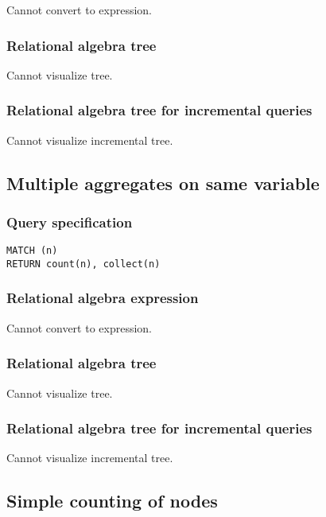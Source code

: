 Cannot convert to expression.

\subsubsection*{Relational algebra tree}

Cannot visualize tree.

\subsubsection*{Relational algebra tree for incremental queries}

Cannot visualize incremental tree.

\subsection{Multiple aggregates on same variable}

\subsubsection*{Query specification}

\begin{lstlisting}
MATCH (n)
RETURN count(n), collect(n)
\end{lstlisting}

\subsubsection*{Relational algebra expression}

Cannot convert to expression.

\subsubsection*{Relational algebra tree}

Cannot visualize tree.

\subsubsection*{Relational algebra tree for incremental queries}

Cannot visualize incremental tree.

\subsection{Simple counting of nodes}

